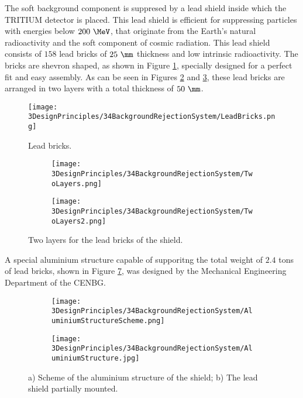 The soft background component is suppresed by a lead shield inside which the TRITIUM detector is placed. This lead shield is efficient for suppressing particles with energies below $200~\MeV$, that originate from the Earth's natural radioactivity and the soft component of cosmic radiation. This lead shield consists of $158$ lead bricks of $25~\mm$ thickness and low intrinsic radioactivity. The bricks are shevron shaped, as shown in Figure \ref{fig:LeadBrick}, specially designed for a perfect fit and easy assembly. As can be seen in Figures \ref{subfig:TwoLayers} and \ref{subfig:TwoLayers2}, these lead bricks are arranged in two layers with a total thickness of $50~\mm$. 

\begin{figure}[h]
\texttt{[image: 3DesignPrinciples/34BackgroundRejectionSystem/LeadBricks.png]}
\centering
\caption{Lead bricks.\label{fig:LeadBrick}}
\end{figure}

\begin{figure}[h]
\centering
    \begin{subfigure}[b]{0.5\textwidth}
    \centering
    \texttt{[image: 3DesignPrinciples/34BackgroundRejectionSystem/TwoLayers.png]}  
    \caption{\label{subfig:TwoLayers}}
    \end{subfigure}
    \hfill
    \begin{subfigure}[b]{0.4\textwidth}
    \centering
    \texttt{[image: 3DesignPrinciples/34BackgroundRejectionSystem/TwoLayers2.png]}  
    \caption{\label{subfig:TwoLayers2}}
    \end{subfigure}
 \caption{Two layers for the lead bricks of the shield.}
 \label{fig:LeadBricksAndArrangement}
\end{figure}

A special aluminium structure capable of supporitng the total weight of $2.4$ tons of lead bricks, shown in Figure \ref{fig:AluminiumStructure}, was designed by the Mechanical Engineering Department of the CENBG.

\begin{figure}
\centering
    \begin{subfigure}[b]{0.5\textwidth}
    \centering
    \texttt{[image: 3DesignPrinciples/34BackgroundRejectionSystem/AluminiumStructureScheme.png]}  
    \caption{\label{subfig:AluminiumStructureScheme}}
    \end{subfigure}
    \hfill
    \begin{subfigure}[b]{0.45\textwidth}
    \centering
    \texttt{[image: 3DesignPrinciples/34BackgroundRejectionSystem/AluminiumStructure.jpg]}  
    \caption{\label{subfig:AluminiumStructure}}
    \end{subfigure}
    \caption{a) Scheme of the aluminium structure of the shield; b) The lead shield partially mounted.}
 \label{fig:AluminiumStructure}
\end{figure}

